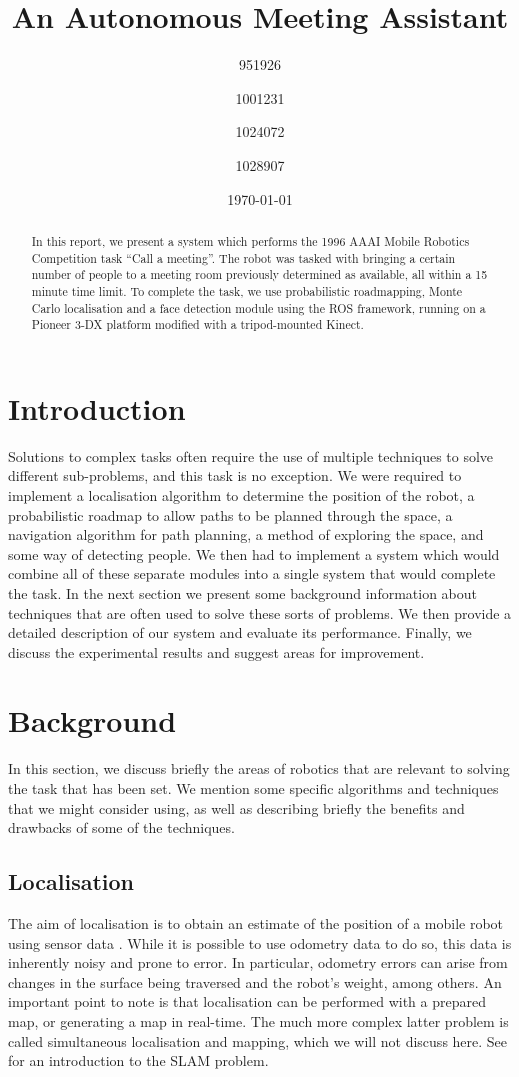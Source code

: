 \documentclass[conference]{IEEEtran}
\title{An Autonomous Meeting Assistant}
\author{951926 \and 1001231 \and 1024072 \and 1028907}
\date{\today}
\begin{document}
\maketitle

\begin{abstract}
In this report, we present a system which performs the 1996 AAAI Mobile Robotics Competition task ``Call a meeting''\cite{AAAIcomp}. The robot was tasked with bringing a certain number of people to a meeting room previously determined as available, all within a 15 minute time limit. To complete the task, we use probabilistic roadmapping, Monte Carlo localisation and a face detection module using the ROS framework, running on a Pioneer 3-DX platform modified with a tripod-mounted Kinect.
\end{abstract}
\section{Introduction}
Solutions to complex tasks often require the use of multiple techniques to solve different sub-problems, and this task is no exception. We were required to implement a localisation algorithm to determine the position of the robot, a probabilistic roadmap to allow paths to be planned through the space, a navigation algorithm for path planning, a method of exploring the space, and some way of detecting people. We then had to implement a system which would combine all of these separate modules into a single system that would complete the task. In the next section we present some background information about techniques that are often used to solve these sorts of problems. We then provide a detailed description of our system and evaluate its performance. Finally, we discuss the experimental results and suggest areas for improvement.

\section{Background}
In this section, we discuss briefly the areas of robotics that are relevant to solving the task that has been set. We mention some specific algorithms and techniques that we might consider using, as well as describing briefly the benefits and drawbacks of some of the techniques.

\subsection{Localisation}
The aim of localisation is to obtain an estimate of the position of a mobile robot using sensor data \cite{localisation}. While it is possible to use odometry data to do so, this data is inherently noisy and prone to error. In particular, odometry errors can arise from changes in the surface being traversed and the robot's weight, among others. An important point to note is that localisation can be performed with a prepared map, or generating a map in real-time. The much more complex latter problem is called simultaneous localisation and mapping, which we will not discuss here. See \cite{slam} for an introduction to the SLAM problem.
\end{document}
